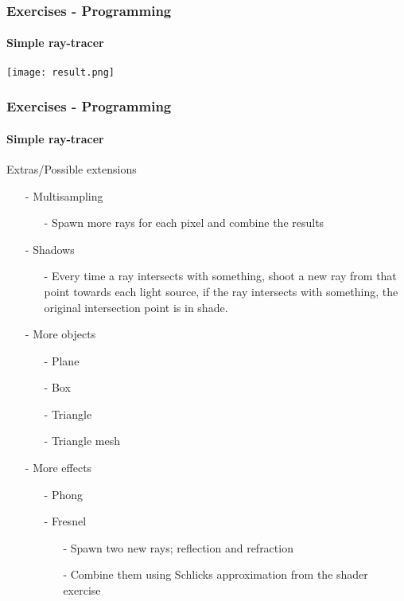 \documentclass[8pt]{beamer}
\begin{document}
	\begin{frame}[fragile]
	\frametitle{Exercises - Programming}
	\framesubtitle{Simple ray-tracer}
	\texttt{[image: result.png]}
	
	\end{frame}
	
	\begin{frame}[fragile]
	\frametitle{Exercises - Programming}
	\framesubtitle{Simple ray-tracer}
	Extras/Possible extensions
	\begin{enumerate}
	\item[-] Multisampling 
	\begin{enumerate}
	\item[-] Spawn more rays for each pixel and combine the results
	\end{enumerate}
	\item[-] Shadows
	\begin{enumerate}
	\item[-] Every time a ray intersects with something, shoot a new ray from that point towards each light source, if the ray intersects with something, the original intersection point is in shade.
	\end{enumerate}
	\item[-] More objects
	\begin{enumerate}
	\item[-]Plane
	\item[-]Box
	\item[-]Triangle
	\item[-]Triangle mesh
	\end{enumerate}
	\item[-] More effects
	\begin{enumerate}
	\item[-]Phong
	\item[-]Fresnel
	\begin{enumerate}
	\item[-]Spawn two new rays; reflection and refraction
	\item[-]Combine them using Schlicks approximation from the shader exercise
	\end{enumerate}
	\end{enumerate}
	\end{enumerate}
	
	\end{frame}
	
	
\end{document}
